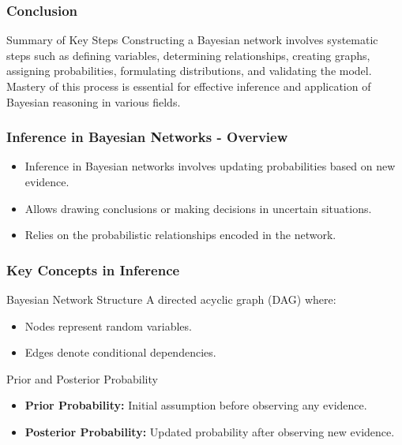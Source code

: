 \documentclass[aspectratio=169]{beamer}
\begin{document}
\begin{frame}[fragile]
    \frametitle{Conclusion}
    \begin{block}{Summary of Key Steps}
        Constructing a Bayesian network involves systematic steps such as defining variables, determining relationships, creating graphs, assigning probabilities, formulating distributions, and validating the model. Mastery of this process is essential for effective inference and application of Bayesian reasoning in various fields.
    \end{block}
\end{frame}

\begin{frame}[fragile]
    \frametitle{Inference in Bayesian Networks - Overview}
    \begin{itemize}
        \item Inference in Bayesian networks involves updating probabilities based on new evidence.
        \item Allows drawing conclusions or making decisions in uncertain situations.
        \item Relies on the probabilistic relationships encoded in the network.
    \end{itemize}
\end{frame}

\begin{frame}[fragile]
    \frametitle{Key Concepts in Inference}
    \begin{block}{Bayesian Network Structure}
        A directed acyclic graph (DAG) where:
        \begin{itemize}
            \item Nodes represent random variables.
            \item Edges denote conditional dependencies.
        \end{itemize}
    \end{block}
    
    \begin{block}{Prior and Posterior Probability}
        \begin{itemize}
            \item \textbf{Prior Probability:} Initial assumption before observing any evidence.
            \item \textbf{Posterior Probability:} Updated probability after observing new evidence.
        \end{itemize}
    \end{block}
\end{frame}
\end{document}
